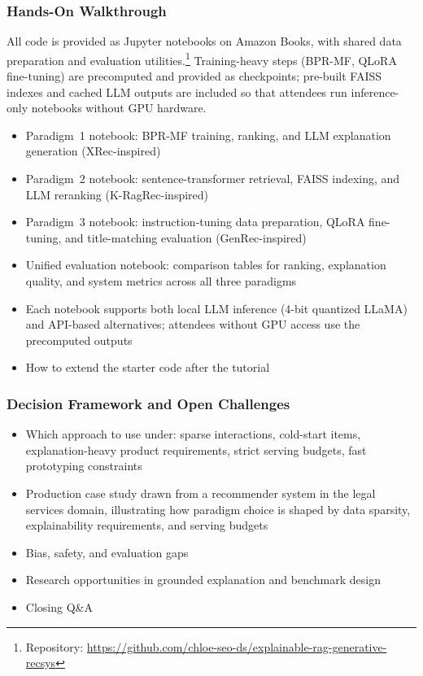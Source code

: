 \documentclass[sigconf,nonacm]{acmart}
\begin{document}
\subsubsection{Hands-On Walkthrough}
All code is provided as Jupyter notebooks on Amazon Books, with shared data preparation and evaluation utilities.\footnote{Repository: \url{https://github.com/chloe-seo-ds/explainable-rag-generative-recsys}}
Training-heavy steps (BPR-MF, QLoRA fine-tuning) are precomputed and provided as checkpoints; pre-built FAISS indexes and cached LLM outputs are included so that attendees run inference-only notebooks without GPU hardware.
\begin{itemize}
    \item Paradigm~1 notebook: BPR-MF training, ranking, and LLM explanation generation (XRec-inspired)
    \item Paradigm~2 notebook: sentence-transformer retrieval, FAISS indexing, and LLM reranking (K-RagRec-inspired)
    \item Paradigm~3 notebook: instruction-tuning data preparation, QLoRA fine-tuning, and title-matching evaluation (GenRec-inspired)
    \item Unified evaluation notebook: comparison tables for ranking, explanation quality, and system metrics across all three paradigms
    \item Each notebook supports both local LLM inference (4-bit quantized LLaMA) and API-based alternatives; attendees without GPU access use the precomputed outputs
    \item How to extend the starter code after the tutorial
\end{itemize}

\subsubsection{Decision Framework and Open Challenges}
\begin{itemize}
    \item Which approach to use under: sparse interactions, cold-start items, explanation-heavy product requirements, strict serving budgets, fast prototyping constraints
    \item Production case study drawn from a recommender system in the legal services domain, illustrating how paradigm choice is shaped by data sparsity, explainability requirements, and serving budgets
    \item Bias, safety, and evaluation gaps
    \item Research opportunities in grounded explanation and benchmark design
    \item Closing Q\&A
\end{itemize}
\end{document}
